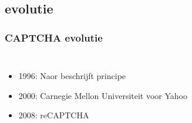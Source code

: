 \documentclass{beamer}
\begin{document}
\subsection{evolutie}
\begin{frame}
  \frametitle{CAPTCHA evolutie}
  \begin{columns}[c]
       \begin{itemize}
         \item<+-> 1996: Naor beschrijft principe
  	     \item<+-> 2000: Carnegie Mellon Universiteit voor Yahoo
  	     \item<+-> 2008: reCAPTCHA
       \end{itemize}
      \begin{center}
      \end{center}
  \end{columns}
\end{frame}
\end{document}
